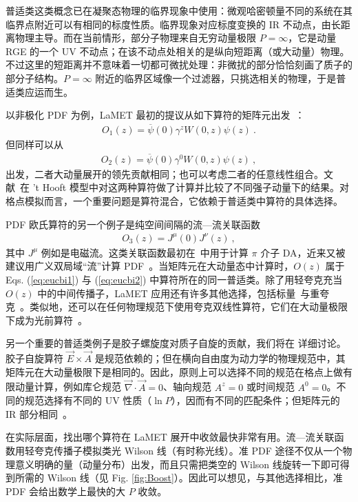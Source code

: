 普适类这类概念已在凝聚态物理的临界现象中使用：微观哈密顿量不同的系统在其临界点附近可以有相同的标度性质。临界现象对应标度变换的 IR 不动点，由长距离物理主导。而在当前情形，部分子物理来自无穷动量极限 $P=\infty$，它是动量 RGE 的一个 UV 不动点；在该不动点处相关的是纵向短距离（或大动量）物理。不过这里的短距离并不意味着一切都可微扰处理：非微扰的部分恰恰刻画了质子的部分子结构。$P=\infty$ 附近的临界区域像一个过滤器，只挑选相关的物理，于是普适类应运而生。

以非极化 PDF 为例，LaMET 最初的提议从如下算符的矩阵元出发~\cite{Ji:2013dva}：
\begin{align}
	O_1(z)=  \overline{\psi}(0)\gamma^zW(0,z)\psi(z) \ .
	\label{eq:eucbi1}
\end{align}
但同样可以从~\cite{Radyushkin:2016hsy,Constantinou:2017sej}
\begin{align}
	O_2(z)= \overline{\psi}(0)\gamma^0W(0,z)\psi(z) \ ,
	\label{eq:eucbi2}
\end{align}
出发，二者大动量展开的领先贡献相同；也可以考虑二者的任意线性组合。文献~\cite{Jia:2018qee}在 't Hooft 模型中对这两种算符做了计算并比较了不同强子动量下的结果。对格点模拟而言，一个重要问题是算符混合，它依赖于普适类中算符的具体选择。

PDF 欧氏算符的另一个例子是纯空间间隔的流—流关联函数
\begin{align}
	O_3(z)=J^\mu(0)J^\nu(z) \ ,
\end{align}
其中 $J^\mu$ 例如是电磁流。这类关联函数最初在~\cite{Braun:2007wv,Bali:2017gfr}中用于计算 $\pi$ 介子 DA，近来又被建议用广义双局域``流''计算 PDF~\cite{Ma:2017pxb}。当矩阵元在大动量态中计算时，$O(z)$ 属于 Eqs. (\ref{eq:eucbi1}) 与
(\ref{eq:eucbi2}) 中算符所在的同一普适类。除了用轻夸克充当 $O(z)$ 中的中间传播子，LaMET 应用还有许多其他选择，包括标量~\cite{Aglietti:1998ur,Abada:2001if}与重夸克~\cite{Detmold:2005gg}。类似地，还可以在任何物理规范下使用夸克双线性算符，它们在大动量极限下成为光前算符~\cite{Gupta:1993vp}。

另一个重要的普适类例子是胶子螺旋度对质子自旋的贡献，我们将在  详细讨论。胶子自旋算符 $\vec{E}\times \vec{A}$ 是规范依赖的；但在横向自由度为动力学的物理规范中，其矩阵元在大动量极限下是相同的。因此，原则上可以选择不同的规范在格点上做有限动量计算，例如库仑规范 $\vec{\nabla}\cdot \vec{A}=0$、轴向规范 $A^z=0$ 或时间规范 $A^0=0$。不同的规范选择有不同的 UV 性质（$\ln P$），因而有不同的匹配条件；但矩阵元的 IR 部分相同~\cite{Hatta:2013gta}。

在实际层面，找出哪个算符在 LaMET 展开中收敛最快非常有用。流—流关联函数用轻夸克传播子模拟类光 Wilson 线（有时称光线）。准 PDF 途径不仅从一个物理意义明确的量（动量分布）出发，而且只需把类空的 Wilson 线旋转一下即可得到所需的 Wilson 线（见 Fig. \ref{fig:Boost}）。因此可以想见，与其他选择相比，准 PDF 会给出数学上最快的大 $P$ 收敛。

